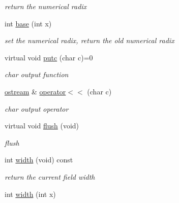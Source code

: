 \begin{DoxyCompactItemize}
\begin{DoxyCompactList}\small\item\em return the numerical radix \end{DoxyCompactList}\item 
int \hyperlink{classhwlib_1_1ostream_a0895d45a31d89352d5c167dc0932399b}{base} (int x)\hypertarget{classhwlib_1_1ostream_a0895d45a31d89352d5c167dc0932399b}{}\label{classhwlib_1_1ostream_a0895d45a31d89352d5c167dc0932399b}

\begin{DoxyCompactList}\small\item\em set the numerical radix, return the old numerical radix \end{DoxyCompactList}\item 
virtual void \hyperlink{classhwlib_1_1ostream_a3b2b77c9e933b76bd6ddd85b9883a31b}{putc} (char c)=0
\begin{DoxyCompactList}\small\item\em char output function \end{DoxyCompactList}\item 
\hyperlink{classhwlib_1_1ostream}{ostream} \& \hyperlink{classhwlib_1_1ostream_ab7fd8d969cd3533df36944233da5c64b}{operator$<$$<$} (char c)\hypertarget{classhwlib_1_1ostream_ab7fd8d969cd3533df36944233da5c64b}{}\label{classhwlib_1_1ostream_ab7fd8d969cd3533df36944233da5c64b}

\begin{DoxyCompactList}\small\item\em char output operator \end{DoxyCompactList}\item 
virtual void \hyperlink{classhwlib_1_1ostream_ab4587e3151fc02c5faba3b06522e337f}{flush} (void)
\begin{DoxyCompactList}\small\item\em flush \end{DoxyCompactList}\item 
int \hyperlink{classhwlib_1_1ostream_aa4d58cb368e67310cd70bf9cc8579966}{width} (void) const \hypertarget{classhwlib_1_1ostream_aa4d58cb368e67310cd70bf9cc8579966}{}\label{classhwlib_1_1ostream_aa4d58cb368e67310cd70bf9cc8579966}

\begin{DoxyCompactList}\small\item\em return the current field width \end{DoxyCompactList}\item 
int \hyperlink{classhwlib_1_1ostream_a3f65c4ae6cba8d58e7f5b21f19667c0f}{width} (int x)\hypertarget{classhwlib_1_1ostream_a3f65c4ae6cba8d58e7f5b21f19667c0f}{}\label{classhwlib_1_1ostream_a3f65c4ae6cba8d58e7f5b21f19667c0f}


\end{DoxyCompactItemize}
